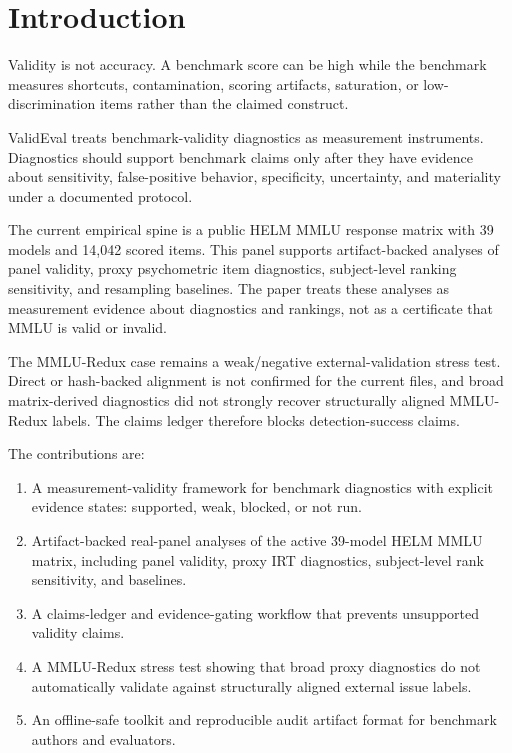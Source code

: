\section{Introduction}

Validity is not accuracy. A benchmark score can be high while the benchmark measures shortcuts,
contamination, scoring artifacts, saturation, or low-discrimination items rather than the claimed
construct.

ValidEval treats benchmark-validity diagnostics as measurement instruments. Diagnostics should
support benchmark claims only after they have evidence about sensitivity, false-positive behavior,
specificity, uncertainty, and materiality under a documented protocol.

The current empirical spine is a public HELM MMLU response matrix with 39 models and 14,042 scored
items. This panel supports artifact-backed analyses of panel validity, proxy psychometric item
diagnostics, subject-level ranking sensitivity, and resampling baselines. The paper treats these
analyses as measurement evidence about diagnostics and rankings, not as a certificate that MMLU is
valid or invalid.

The MMLU-Redux case remains a weak/negative external-validation stress test. Direct or hash-backed
alignment is not confirmed for the current files, and broad matrix-derived diagnostics did not
strongly recover structurally aligned MMLU-Redux labels. The claims ledger therefore blocks
detection-success claims.

The contributions are:

\begin{enumerate}
  \item A measurement-validity framework for benchmark diagnostics with explicit evidence states:
  supported, weak, blocked, or not run.
  \item Artifact-backed real-panel analyses of the active 39-model HELM MMLU matrix, including
  panel validity, proxy IRT diagnostics, subject-level rank sensitivity, and baselines.
  \item A claims-ledger and evidence-gating workflow that prevents unsupported validity claims.
  \item A MMLU-Redux stress test showing that broad proxy diagnostics do not automatically validate
  against structurally aligned external issue labels.
  \item An offline-safe toolkit and reproducible audit artifact format for benchmark authors and
  evaluators.
\end{enumerate}
